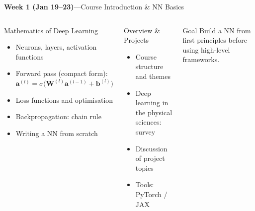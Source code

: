 \documentclass[aspectratio=169,11pt]{beamer}
\begin{document}
\begin{frame}{{\color{mlgold}\textbf{Week 1 (Jan 19--23)}\;---\;Course Introduction \& NN Basics}}
  \begin{columns}[T]
      \begin{block}{Mathematics of Deep Learning}
        \begin{itemize}\itemsep1pt
          \item Neurons, layers, activation functions
          \item Forward pass (compact form):\\
                $\bm{a}^{(l)} = \sigma\!\bigl(\bm{W}^{(l)}\bm{a}^{(l-1)}+\bm{b}^{(l)}\bigr)$
          \item Loss functions and optimisation
          \item Backpropagation: chain rule
          \item Writing a NN from scratch
        \end{itemize}
      \end{block}
      \begin{block}{Overview \& Projects}
        \begin{itemize}\itemsep2pt
          \item Course structure and themes
          \item Deep learning in the physical sciences: survey
          \item Discussion of project topics
          \item Tools: PyTorch / JAX
        \end{itemize}
      \end{block}
      \vspace{3pt}
      \begin{alertblock}{Goal}
        Build a NN from first principles
        before using high-level frameworks.
      \end{alertblock}
  \end{columns}
\end{frame}
\end{document}
